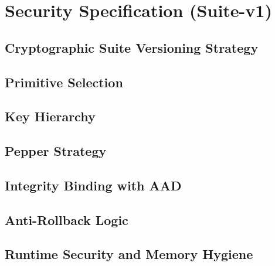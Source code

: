 %
%

\chapter{Security Specification (Suite-v1)}

\section{Cryptographic Suite Versioning Strategy}

\section{Primitive Selection}

\section{Key Hierarchy}

\section{Pepper Strategy}

\section{Integrity Binding with AAD}

\section{Anti-Rollback Logic}

\section{Runtime Security and Memory Hygiene}
